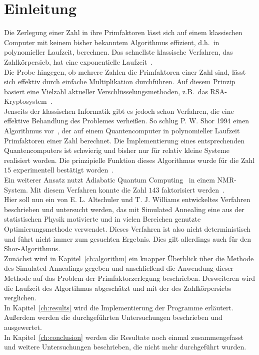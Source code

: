 \chapter{Einleitung}
\setcounter{page}{1}
Die Zerlegung einer Zahl in ihre Primfaktoren lässt sich auf einem klassischen Computer mit keinem bisher bekanntem Algorithmus effizient, d.h.\ in polynomieller Laufzeit, berechnen. Das schnellste klassische Verfahren, das Zahlkörpersieb, hat eine exponentielle Laufzeit~\parencite{pomerance}.\\
Die Probe hingegen, ob mehrere Zahlen die Primfaktoren einer Zahl sind, lässt sich effektiv durch einfache Multiplikation durchführen. Auf diesem Prinzip basiert eine Vielzahl aktueller Verschlüsselungsmethoden, z.B.\ das RSA-Kryptosystem~\parencite{rsa}. \\
Jenseits der klassischen Informatik gibt es jedoch schon Verfahren, die eine effektive Behandlung des Problemes verheißen. So schlug P. W. Shor 1994 einen Algorithmus vor~\parencite{shor}, der auf einem Quantencomputer in polynomieller Laufzeit Primfaktoren einer Zahl berechnet. Die Implementierung eines entsprechenden Quantencomputers ist schwierig und bisher nur für relativ kleine Systeme realisiert worden. Die prinzipielle Funktion dieses Algorithmus wurde für die Zahl $15$ experimentell bestätigt worden~\parencite{vandersypen}.\\
Ein weiterer Ansatz nutzt Adiabatic Quantum Computing~\parencite{suter} in einem NMR-System. Mit diesem Verfahren konnte die Zahl $143$ faktorisiert werden~\parencite{xu}. \\
Hier soll nun ein von E. L. Altschuler und T. J. Williams entwickeltes Verfahren~\parencite{altschuler} beschrieben und untersucht werden, das mit Simulated Annealing eine aus der statistischen Physik motivierte und in vielen Bereichen genutzte Optimierungsmethode verwendet. Dieses Verfahren ist also nicht deterministisch und führt nicht immer zum gesuchten Ergebnis. Dies gilt allerdings auch für den Shor-Algorithmus.\\
Zunächst wird in Kapitel~\ref{ch:algorithm} ein knapper Überblick über die Methode des Simulated Annealings gegeben und anschließend die Anwendung dieser Methode auf das Problem der Primfaktorzerlegung beschrieben. Desweiteren wird die Laufzeit des Algortihmus abgeschätzt und mit der des Zahlkörpersiebs verglichen.\\
In Kapitel~\ref{ch:results} wird die Implementierung der Programme erläutert. Außerdem werden die durchgeführten Untersuchungen beschrieben und ausgewertet.\\
In Kapitel~\ref{ch:conclusion} werden die Resultate noch einmal zusammengefasst und weitere Untersuchungen beschrieben, die nicht mehr durchgeführt wurden.
